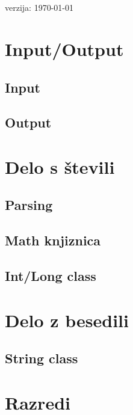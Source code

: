 \documentclass[a4paper,oneside,12pt]{article}
\title{\mytitle}
\author{Rok Kos}
\date{\today}
\theoremstyle{definition}
\begin{document}
\thispagestyle{empty}

\vspace*{\fill}
\begin{center}
  \scalebox{3}{Dokumentacija za Izpit}\\[6ex]
  \scalebox{2}{Rok Kos}\\[4ex]
  \vfill
  verzija: \today
\end{center}

\newpage

\tableofcontents

\newpage

\section{Input/Output}
	\subsection{Input}
	\subsection{Output}
\section{Delo s števili}
	\subsection{Parsing}
	\subsection{Math knjiznica}
	\subsection{Int/Long class}
\section{Delo z besedili}
	\subsection{String class}
\section{Razredi}
\end{document}
